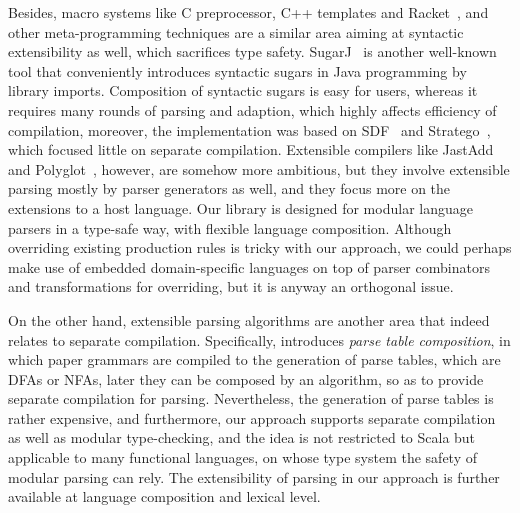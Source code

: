 Besides, macro systems like C preprocessor, C++ templates and Racket~\cite{Tobin-Hochstadt2011}, and other meta-programming techniques are a similar area aiming at syntactic extensibility as well, which sacrifices type safety. SugarJ~\cite{Erdweg2011} is another well-known tool that conveniently introduces syntactic sugars in Java programming by library imports. Composition of syntactic sugars is easy for users, whereas it requires many rounds of parsing and adaption, which highly affects efficiency of compilation, moreover, the implementation was based on SDF~\cite{Heering1989} and Stratego~\cite{Visser2001}, which focused little on separate compilation. Extensible compilers like JastAdd~\cite{Ekman2007} and Polyglot~\cite{Nystrom2003}, however, are somehow more ambitious, but they involve extensible parsing mostly by parser generators as well, and they focus more on the extensions to a host language. Our library is designed for modular language parsers in a type-safe way, with flexible language composition. Although overriding existing production rules is tricky with our approach, we could perhaps make use of embedded domain-specific languages on top of parser combinators and transformations for overriding, but it is anyway an orthogonal issue.      

On the other hand, extensible parsing algorithms are another area that indeed relates to separate compilation. Specifically, \cite{Bravenboer2009} introduces \textit{parse table composition}, in which paper grammars are compiled to the generation of parse tables, which are DFAs or NFAs, later they can be composed by an algorithm, so as to provide separate compilation for parsing. Nevertheless, the generation of parse tables is rather expensive, and furthermore, our approach supports separate compilation as well as modular type-checking, and the idea is not restricted to Scala but applicable to many functional languages, on whose type system the safety of modular parsing can rely. The extensibility of parsing in our approach is further available at language composition and lexical level.

